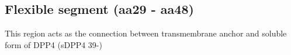 \subsection{Flexible segment (aa29 - aa48)}

This region acts as the connection between transmembrane anchor and soluble form of DPP4 (sDPP4 39-) 
